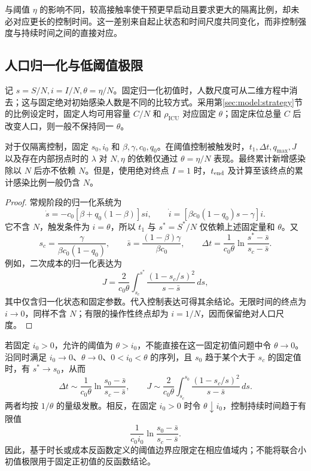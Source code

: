 \documentclass[lang=cn,a4paper,newtx]{elegantpaper}
\numberwithin{equation}{section}
\theoremstyle{plain}
\begin{document}
与阈值 $\eta$ 的影响不同，较高接触率使干预更早启动且要求更大的隔离比例，却未必对应更长的控制时间。这一差别来自起止状态和时间尺度共同变化，而非控制强度与持续时间之间的直接对应。

\subsection{人口归一化与低阈值极限}
\label{sec:scaling-theory}
记 $s=S/N,i=I/N,\theta=\eta/N$。固定归一化初值时，人数尺度可从二维方程中消去；这与固定绝对初始感染人数是不同的比较方式。采用第\ref{sec:model:strategy}节的比例设定时，固定人均可用容量 $C/N$ 和 $\rho_{\mathrm{ICU}}$ 对应固定 $\theta$；固定床位总量 $C$ 后改变人口，则一般不保持同一 $\theta$。
\begin{proposition}
\label{prop:scaling}
对于仅隔离控制，固定 $s_0,i_0$ 和 $\beta,\gamma,c_0,q_0$。在阈值控制被触发时，$t_1,\Delta t,q_{\max},J$ 以及存在内部拐点时的 $\lambda$ 对 $N,\eta$ 的依赖仅通过 $\theta=\eta/N$ 表现。最终累计新增感染除以 $N$ 后亦不依赖 $N$。但是，使用绝对终点 $I=1$ 时，$t_{\rm end}$ 及计算至该终点的累计感染比例一般仍含 $N$。
\end{proposition}
\begin{proof}
常规阶段的归一化系统为
\[
\dot s=-c_0[\beta+q_0(1-\beta)]si,\qquad
\dot i=[\beta c_0(1-q_0)s-\gamma]i.
\]
它不含 $N$，触发条件为 $i=\theta$，所以 $t_1$ 与 $s^*=S^*/N$ 仅依赖上述固定量和 $\theta$。又
\[
s_c=\frac{\gamma}{\beta c_0(1-q_0)},\qquad
\bar s=\frac{(1-\beta)\gamma}{\beta c_0},\qquad
\Delta t=\frac1{c_0\theta}\ln\frac{s^*-\bar s}{s_c-\bar s}.
\]
例如，二次成本的归一化表达为
\begin{equation}
J=\frac{2}{c_0\theta}\int_{s_c}^{s^*}
\frac{(1-s_c/s)^2}{s-\bar s}\,ds,
\label{eq:dom:Jtheta}
\end{equation}
其中仅含归一化状态和固定参数。代入控制表达可得其余结论。无限时间的终点为 $i\to0$，同样不含 $N$；有限的操作性终点却为 $i=1/N$，因而保留绝对人口尺度。
\end{proof}

若固定 $i_0>0$，允许的阈值为 $\theta>i_0$，不能直接在这一固定初值问题中令 $\theta\to0$。沿同时满足 $i_0\to0$、$\theta\to0$、$0<i_0<\theta$ 的序列，且 $s_0$ 趋于某个大于 $s_c$ 的固定值时，有 $s^*\to s_0$，从而
\begin{equation}
\Delta t\sim\frac1{c_0\theta}\ln\frac{s_0-\bar s}{s_c-\bar s},\qquad
J\sim\frac2{c_0\theta}\int_{s_c}^{s_0}\frac{(1-s_c/s)^2}{s-\bar s}\,ds.
\label{eq:small-threshold}
\end{equation}
两者均按 $1/\theta$ 的量级发散。相反，在固定 $i_0>0$ 时令 $\theta\downarrow i_0$，控制持续时间趋于有限值
\[
\frac1{c_0i_0}\ln\frac{s_0-\bar s}{s_c-\bar s}.
\]
因此，基于时长或成本反函数定义的阈值边界应限定在相应值域内；不能将联合小初值极限用于固定正初值的反函数结论。
\end{document}
